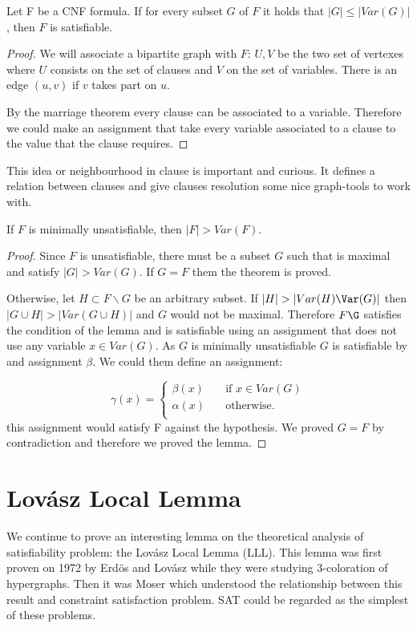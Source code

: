 \begin{lemma}
Let F be a CNF formula. If for every subset $G$ of $F$ it holds that $|G|\le |Var(G)|$, then $F$ is satisfiable.
\end{lemma}

\begin{proof}
  We will associate a bipartite graph with $F$:  $U, V$ be the two set of vertexes where $U$ consists on the set of clauses and $V$ on the set of variables. There is an edge $(u,v)$ if $v$ takes part on $u$.

  By the marriage theorem every clause can be associated to a variable. Therefore we could make an assignment that take every variable associated to a clause to the value that the clause requires.
\end{proof}

This idea or neighbourhood in clause is important and curious. It defines a relation between clauses and give clauses resolution some nice graph-tools to work with.

\begin{proposition}
	If $F$ is minimally unsatisfiable, then $|F| > Var(F)$.
\end{proposition}

\begin{proof}
  Since $F$ is unsatisfiable, there must be a subset $G$ such that is maximal and satisfy $|G| > Var(G)$. If $G=F$ them the theorem is proved.


  Otherwise, let $H \subset F\backslash G$ be an arbitrary subset. If $|H| > |Var(H)\Var(G)|$ then $|G \cup H| > |Var(G\cup H)|$ and $G$ would not be maximal.  Therefore $F\G$ satisfies the condition of the lemma and is satisfiable using an assignment that does not use any variable $x \in Var(G)$. As $G$ is minimally unsatisfiable $G$ is satisfiable by and assignment $\beta$. We could them define an assignment:

  \[   
\gamma(x) = 
     \begin{cases}
       \beta(x) &\quad\text{if } x \in Var(G)\\
       \alpha(x) &\quad\text{otherwise.} \\ 
     \end{cases}
   \]
this assignment would satisfy F against the hypothesis. We proved $G=F$ by contradiction and therefore we proved the lemma.
\end{proof}




\section{Lovász Local Lemma}
We continue to prove an interesting lemma on the theoretical analysis of satisfiability problem: the Lovász Local Lemma (LLL). This lemma was first proven on 1972 by Erdös and Lovász while they were studying 3-coloration of hypergraphs. Then it was Moser which understood the relationship between  this result and constraint satisfaction problem. SAT could be regarded as the simplest of these problems. \\

